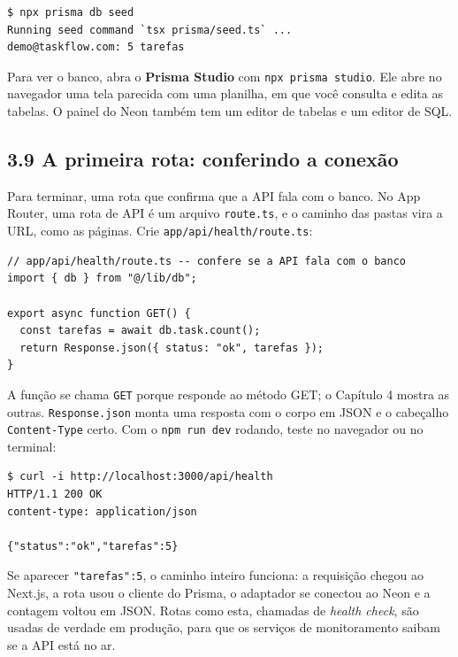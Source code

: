 \begin{codigo}
\begin{Verbatim}[breaklines=true, breaksymbolleft={}, fontsize=\footnotesize]
$ npx prisma db seed
Running seed command `tsx prisma/seed.ts` ...
demo@taskflow.com: 5 tarefas
\end{Verbatim}
\end{codigo}

Para ver o banco, abra o \textbf{Prisma Studio} com \texttt{npx prisma studio}. Ele abre no navegador uma tela parecida com uma planilha, em que você consulta e edita as tabelas. O painel do Neon também tem um editor de tabelas e um editor de SQL.

\subsection{3.9 A primeira rota: conferindo a conexão}

Para terminar, uma rota que confirma que a API fala com o banco. No App Router, uma rota de API é um arquivo \texttt{route.ts}, e o caminho das pastas vira a URL, como as páginas. Crie \texttt{app/api/health/route.ts}:

\begin{codigo}
\begin{Verbatim}[breaklines=true, breaksymbolleft={}, fontsize=\footnotesize]
// app/api/health/route.ts -- confere se a API fala com o banco
import { db } from "@/lib/db";

export async function GET() {
  const tarefas = await db.task.count();
  return Response.json({ status: "ok", tarefas });
}
\end{Verbatim}
\end{codigo}

A função se chama \texttt{GET} porque responde ao método GET; o Capítulo 4 mostra as outras. \texttt{Response.json} monta uma resposta com o corpo em JSON e o cabeçalho \texttt{Content-Type} certo. Com o \texttt{npm run dev} rodando, teste no navegador ou no terminal:

\begin{codigo}
\begin{Verbatim}[breaklines=true, breaksymbolleft={}, fontsize=\footnotesize]
$ curl -i http://localhost:3000/api/health
HTTP/1.1 200 OK
content-type: application/json

{"status":"ok","tarefas":5}
\end{Verbatim}
\end{codigo}

Se aparecer \texttt{"tarefas":5}, o caminho inteiro funciona: a requisição chegou ao Next.js, a rota usou o cliente do Prisma, o adaptador se conectou ao Neon e a contagem voltou em JSON. Rotas como esta, chamadas de \textit{health check}, são usadas de verdade em produção, para que os serviços de monitoramento saibam se a API está no ar.

